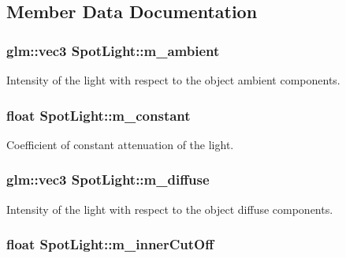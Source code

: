 \subsection{Member Data Documentation}
\hypertarget{classSpotLight_a8120c87715c0d55a139562b01f0af3c6}{
\subsubsection[{m\+\_\+ambient}]{\setlength{\rightskip}{0pt plus 5cm}glm\+::vec3 Spot\+Light\+::m\+\_\+ambient\hspace{0.3cm}{\ttfamily [private]}}}\label{classSpotLight_a8120c87715c0d55a139562b01f0af3c6}
Intensity of the light with respect to the object ambient components. \hypertarget{classSpotLight_a34d9b43d8bfe559da5d13566ca7882f9}{
\subsubsection[{m\+\_\+constant}]{\setlength{\rightskip}{0pt plus 5cm}float Spot\+Light\+::m\+\_\+constant\hspace{0.3cm}{\ttfamily [private]}}}\label{classSpotLight_a34d9b43d8bfe559da5d13566ca7882f9}
Coefficient of constant attenuation of the light. \hypertarget{classSpotLight_aba029b38f4ee2b6942bc7c2819621cef}{
\subsubsection[{m\+\_\+diffuse}]{\setlength{\rightskip}{0pt plus 5cm}glm\+::vec3 Spot\+Light\+::m\+\_\+diffuse\hspace{0.3cm}{\ttfamily [private]}}}\label{classSpotLight_aba029b38f4ee2b6942bc7c2819621cef}
Intensity of the light with respect to the object diffuse components. \hypertarget{classSpotLight_a9b7c5db8293b0bab65df4474a578bb5d}{
\subsubsection[{m\+\_\+inner\+Cut\+Off}]{\setlength{\rightskip}{0pt plus 5cm}float Spot\+Light\+::m\+\_\+inner\+Cut\+Off\hspace{0.3cm}{\ttfamily [private]}}}\label{classSpotLight_a9b7c5db8293b0bab65df4474a578bb5d}
